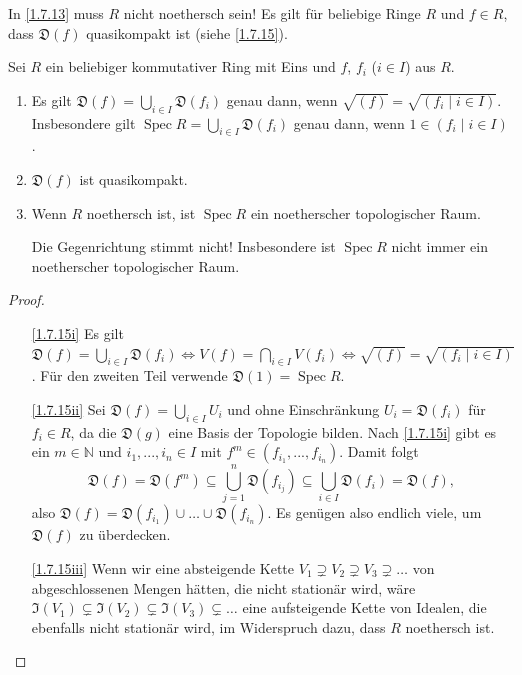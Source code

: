 \documentclass[a4paper,12pt]{scrbook}
\newtheorem{proof}{Beweis}
\def\I{\mathfrak{I}}
\newcommand{\D}{\mathfrak{D}}
\newcommand{\Spec}{\operatorname{Spec}}
\renewcommand{\dotsc}{\ensuremath{\!...}}
\newcommand{\set}[1]{\ensuremath{\mathbb{#1}}}
\newcommand{\N}{\set{N}}
\begin{document}
\begin{bem*}
  In \cref{1.7.13} muss $R$ nicht noethersch sein! Es gilt für beliebige Ringe $R$ und $f\in R$, dass $\D(f)$ quasikompakt ist
  (siehe \cref{1.7.15}).
\end{bem*}

\begin{bem}\label{1.7.15}
  Sei $R$ ein beliebiger kommutativer Ring mit Eins und $f$, $f_i$ ($i\in I$) aus $R$.
  \begin{enumerate}
  \item{} Es gilt $\displaystyle \D(f)=\bigcup_{i\in I}\D(f_i)$ genau dann, wenn $\sqrt{(f)}=\sqrt{(f_i\mid i\in
      I)}$. Insbesondere gilt $\displaystyle\Spec R=\bigcup_{i\in I}\D(f_i)$ genau dann, wenn $1\in(f_i\mid i\in I)$.
  \item{} $\D(f)$ ist quasikompakt.
  \item{} Wenn $R$ noethersch ist, ist $\Spec R$ ein noetherscher topologischer Raum.
    \begin{w}
      Die Gegenrichtung stimmt nicht! Insbesondere ist $\Spec R$ nicht immer ein noetherscher topologischer Raum.
    \end{w}
  \end{enumerate}
\end{bem}
\begin{proof}
  \begin{enumerate}
  \item[\ref{1.7.15i}] Es gilt $\displaystyle \D(f)=\bigcup_{i\in I}\D(f_i) \iff V(f)=\bigcap_{i\in I}V(f_i) \iff
    \sqrt{(f)}=\sqrt{(f_i\mid i\in I)}$. Für den zweiten Teil verwende $\D(1)=\Spec R$.
  \item[\ref{1.7.15ii}] Sei $\D(f)=\bigcup_{i\in I} U_i$ und ohne Einschränkung $U_i=\D(f_i)$ für $f_i\in R$, da die $\D(g)$ eine
    Basis der Topologie bilden. Nach \ref{1.7.15i} gibt es ein $m\in\N$ und $i_1,\dotsc,i_n\in I$ mit
    $f^m\in(f_{i_1},\dotsc,f_{i_n})$. Damit folgt \[ \D(f)=\D(f^m)\subseteq\bigcup_{j=1}^n \D(f_{i_j}) \subseteq\bigcup_{i\in I}
    \D(f_i) = \D(f), \] also $\D(f)=\D(f_{i_1})\cup\dotso\cup \D(f_{i_n})$. Es genügen also endlich viele, um $\D(f)$ zu überdecken.
  \item[\ref{1.7.15iii}] Wenn wir eine absteigende Kette $V_1\supsetneq V_2\supsetneq V_3\supsetneq\dotso$ von abgeschlossenen
    Mengen hätten, die nicht stationär wird, wäre $\I(V_1)\subsetneq\I(V_2)\subsetneq\I(V_3)\subsetneq\dotso$ eine aufsteigende
    Kette von Idealen, die ebenfalls nicht stationär wird, im Widerspruch dazu, dass $R$ noethersch ist.
  \end{enumerate}
\end{proof}
\end{document}
